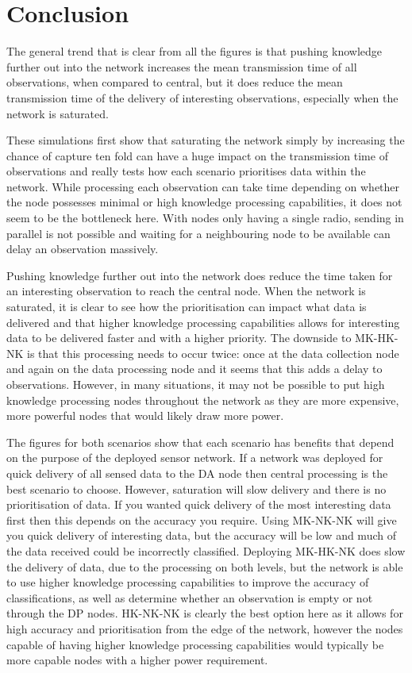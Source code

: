\section{Conclusion}\label{sim:conc}
The general trend that is clear from all the figures is that pushing knowledge further out into the network increases the mean transmission time of all observations, when compared to central, but it does reduce the mean transmission time of the delivery of interesting observations, especially when the network is saturated.

These simulations first show that saturating the network simply by increasing the chance of capture ten fold can have a huge impact on the transmission time of observations and really tests how each scenario prioritises data within the network. While processing each observation can take time depending on whether the node possesses minimal or high knowledge processing capabilities, it does not seem to be the bottleneck here. With nodes only having a single radio, sending in parallel is not possible and waiting for a neighbouring node to be available can delay an observation massively.

Pushing knowledge further out into the network does reduce the time taken for an interesting observation to reach the central node. When the network is saturated, it is clear to see how the prioritisation can impact what data is delivered and that higher knowledge processing capabilities allows for interesting data to be delivered faster and with a higher priority. The downside to MK-HK-NK is that this processing needs to occur twice: once at the data collection node and again on the data processing node and it seems that this adds a delay to observations. However, in many situations, it may not be possible to put high knowledge processing nodes throughout the network as they are more expensive, more powerful nodes that would likely draw more power.

The figures for both scenarios show that each scenario has benefits that depend on the purpose of the deployed sensor network. If a network was deployed for quick delivery of all sensed data to the DA node then central processing is the best scenario to choose. However, saturation will slow delivery and there is no prioritisation of data. If you wanted quick delivery of the most interesting data first then this depends on the accuracy you require. Using MK-NK-NK will give you quick delivery of interesting data, but the accuracy will be low and much of the data received could be incorrectly classified. Deploying MK-HK-NK does slow the delivery of data, due to the processing on both levels, but the network is able to use higher knowledge processing capabilities to improve the accuracy of classifications, as well as determine whether an observation is empty or not through the DP nodes. HK-NK-NK is clearly the best option here as it allows for high accuracy and prioritisation from the edge of the network, however the nodes capable of having higher knowledge processing capabilities would typically be more capable nodes with a higher power requirement.



